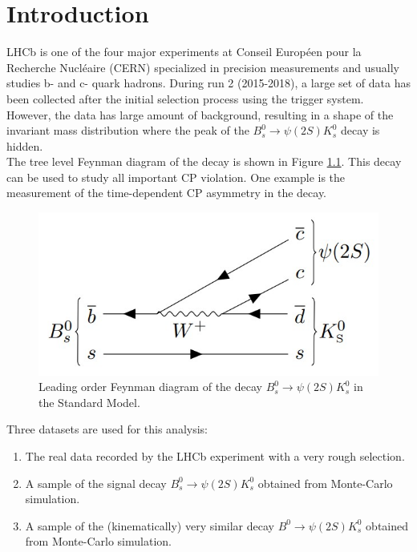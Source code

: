 \chapter{Introduction}
LHCb is one of the four major experiments at Conseil Européen pour la Recherche Nucléaire (CERN) specialized in precision measurements and usually studies b- and c- quark hadrons. During run 2 (2015-2018), a large set of data has been collected after the initial selection process using the trigger system. However, the data has large amount of background, resulting in a shape of the invariant mass distribution where the peak of the $B_{s}^{0} \rightarrow \psi(2S)K_{s}^{0}$ decay is hidden.\\

The tree level Feynman diagram of the decay is shown in Figure \ref{decay}. This decay can be used to study all important CP violation. One example is the measurement of the time-dependent CP asymmetry in the decay.\\

\begin{figure}[H]
    \centering
    \includegraphics[width=0.5\linewidth]{Figure/decay.jpg}
    \caption{Leading order Feynman diagram of the decay $B_{s}^{0} \rightarrow \psi(2S)K_{s}^{0}$ in the Standard Model.}
    \label{decay}
\end{figure}

Three datasets are used for this analysis:\\
\begin{enumerate}
    \item The real data recorded by the LHCb experiment with a very rough
    selection.
    \item A sample of the signal decay $B_{s}^{0} \rightarrow \psi(2S)K_{s}^{0}$ obtained from Monte-Carlo simulation.
    \item A sample of the (kinematically) very similar decay $B^{0} \rightarrow \psi(2S)K_{s}^{0}$ obtained from Monte-Carlo simulation.
\end{enumerate}

